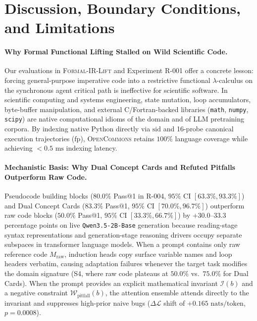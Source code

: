 \documentclass[10pt,twocolumn]{article}
\begin{document}
\section{Discussion, Boundary Conditions, and Limitations}
\label{sec:discussion}

\paragraph{Why Formal Functional Lifting Stalled on Wild Scientific Code.}
Our evaluations in \textsc{Formal-IR-Lift} and Experiment R-001 offer a concrete lesson: forcing general-purpose imperative code into a restrictive functional $\lambda$-calculus on the synchronous agent critical path is ineffective for scientific software. In scientific computing and systems engineering, state mutation, loop accumulators, byte-buffer manipulation, and external C/Fortran-backed libraries (\texttt{math}, \texttt{numpy}, \texttt{scipy}) are native computational idioms of the domain and of LLM pretraining corpora. By indexing native Python directly via $\text{sid}$ and 16-probe canonical execution trajectories ($\text{fp}$), \textsc{OpenCommons} retains $100\%$ language coverage while achieving $<0.5\text{ ms}$ indexing latency.

\paragraph{Mechanistic Basis: Why Dual Concept Cards and Refuted Pitfalls Outperform Raw Code.}
Pseudocode building blocks ($80.0\%$ Pass@1 in R-004, $95\%$ CI $[63.3\%, 93.3\%]$) and Dual Concept Cards ($83.3\%$ Pass@1, $95\%$ CI $[70.0\%, 96.7\%]$) outperform raw code blocks ($50.0\%$ Pass@1, $95\%$ CI $[33.3\%, 66.7\%]$) by $+30.0\text{--}33.3$ percentage points on live \texttt{Qwen3.5-2B-Base} generation because reading-stage syntax representations and generation-stage reasoning drivers occupy separate subspaces in transformer language models. When a prompt contains only raw reference code $M_{\text{raw}}$, induction heads copy surface variable names and loop headers verbatim, causing adaptation failures whenever the target task modifies the domain signature (S4, where raw code plateaus at $50.0\%$ vs.\ $75.0\%$ for Dual Cards). When the prompt provides an explicit mathematical invariant $\mathcal{I}(b)$ and a negative constraint $\mathcal{W}_{\text{pitfall}}(b)$, the attention ensemble attends directly to the invariant and suppresses high-prior naive bugs ($\Delta \mathcal{L}$ shift of $+0.165\text{ nats/token}$, $p = 0.0008$).
\end{document}
